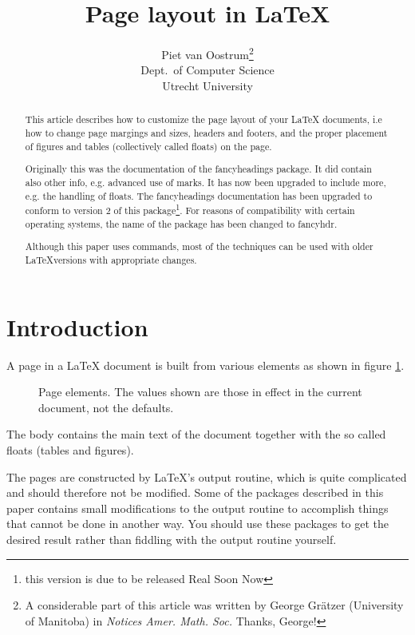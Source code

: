 \documentclass[a4paper]{article}
\title{Page layout in \LaTeX}
\author{Piet van Oostrum\thanks{A considerable part of this article was
    written by  George
    Gr\"atzer (University of Manitoba) in \emph{Notices Amer. Math. Soc.}
    Thanks, George!}\\
  Dept.\ of Computer Science\\
  Utrecht University}
\begin{document}
\maketitle
\begin{abstract}
  This article describes how to customize the page layout of your LaTeX
  documents, i.e how to change page margings and sizes, 
  headers and footers, and the
  proper placement of figures and tables (collectively called floats) on
  the page. 

  Originally this was the documentation of the  \textsf{fancyheadings}
  package. It did contain also other info, e.g. advanced use of marks.
  It has now been upgraded to include more, e.g. the handling of floats.
  The fancyheadings documentation has been upgraded to conform to version 2
  of this package\footnote{this version is due to be released Real Soon Now}. For reasons of compatibility with certain operating systems, the
  name of the package has been changed to \textsf{fancyhdr}.

  Although this paper uses \LaTeXe{} commands, most of the techniques can
  be used with older \LaTeX versions with appropriate changes.
\end{abstract}
\tableofcontents


\section{Introduction}
\label{sec:intro}

A page in a \LaTeX{} document is built from various elements as shown in
figure \ref{fig:layout}. 
\begin{figure}[htbp]
  \begin{center}
    \leavevmode
    \layout
    \vspace{3cm}
    \caption{Page elements. The values shown are those in effect in the current document, not the defaults.}
    \label{fig:layout}
  \end{center}
\end{figure}
\thispagestyle{plain}
The body contains the main text of the document
together with the so called floats (tables and figures). 

The pages are constructed by \LaTeX's output routine, which is quite
complicated and should therefore not be modified. Some of the packages
described in this paper contains small modifications to the output routine
to accomplish things that cannot be done in another way. You should use
these packages to get the desired result rather than fiddling with the
output routine yourself.
\end{document}
